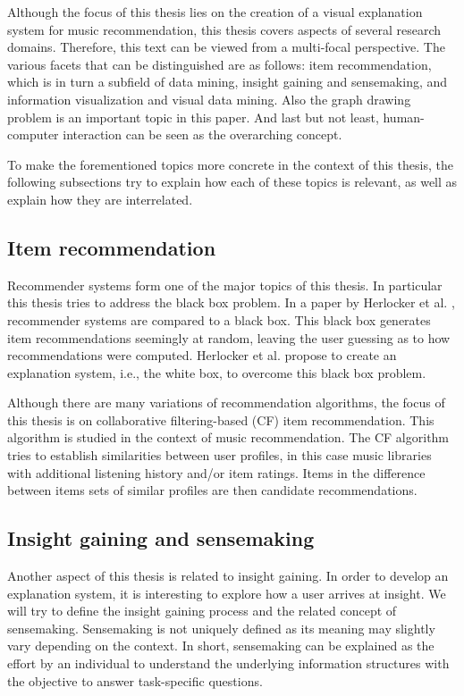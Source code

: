 Although the focus of this thesis lies on the creation of a visual explanation system for music recommendation, this thesis covers aspects of several research domains. Therefore, this text can be viewed from a multi-focal perspective. The various facets that can be distinguished are as follows: item recommendation, which is in turn a subfield of data mining, insight gaining and sensemaking, and information visualization and visual data mining. Also the graph drawing problem is an important topic in this paper. And last but not least, human-computer interaction can be seen as the overarching concept.

To make the forementioned topics more concrete in the context of this thesis, the following subsections try to explain how each of these topics is relevant, as well as explain how they are interrelated.


\subsection{Item recommendation}\label{chapter:introduction:section:perspective:subsection:recommendation}

Recommender systems form one of the major topics of this thesis. In particular this thesis tries to address the black box problem. In a paper by Herlocker et al. \cite{herlocker:2000}, recommender systems are compared to a black box. This black box generates item recommendations seemingly at random, leaving the user guessing as to how recommendations were computed. Herlocker et al. propose to create an explanation system, i.e., the white box, to overcome this black box problem.

Although there are many variations of recommendation algorithms, the focus of this thesis is on collaborative filtering-based (CF) item recommendation. This algorithm is studied in the context of music recommendation. The CF algorithm tries to establish similarities between user profiles, in this case music libraries with additional listening history and/or item ratings. Items in the difference between items sets of similar profiles are then candidate recommendations\cite{rajaraman:2012}.


\subsection{Insight gaining and sensemaking}\label{chapter:introduction:section:perspective:subsection:sensemaking}

Another aspect of this thesis is related to insight gaining. In order to develop an explanation system, it is interesting to explore how a user arrives at insight. We will try to define the insight gaining process and the related concept of sensemaking. Sensemaking is not uniquely defined as its meaning may slightly vary depending on the context\cite{yi:2008}. In short, sensemaking can be explained as the effort by an individual to understand the underlying information structures with the objective to answer task-specific questions\cite{russell:1993:CSS:169059.169209, yi:2008}.


